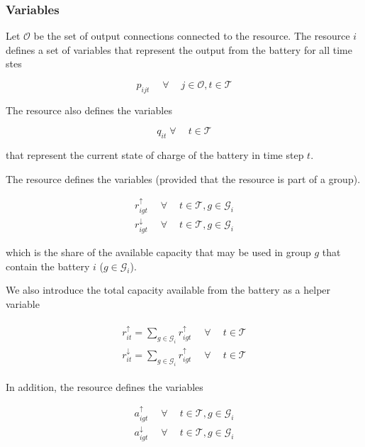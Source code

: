 \documentclass[]{report}
\newcommand{\groups}{\mathcal{G}}
\newcommand{\timesteps}{\mathcal{T}}
\newcommand{\outputs}{\mathcal{O}}
\newcommand{\soc}{q}
\let\oldforall\forall
\renewcommand{\forall}{\; \oldforall \: }
\begin{document}
\subsubsection*{Variables}
Let $\outputs$ be the set of output connections connected to the resource. The resource $i$ defines a set of variables that represent the output from the battery for all time stes

\begin{equation}
    p_{ijt} \quad \forall \quad j \in \outputs, t \in \timesteps
\end{equation}

The resource also defines the variables 

\begin{equation}
    \soc_{it} \forall \quad t \in \timesteps
\end{equation}

that represent the current state of charge of the battery in time step $t$.

The resource defines the variables (provided that the resource is part of a group).

\begin{align}
    r^{\uparrow}_{igt} \quad \forall \quad t \in \timesteps , g \in \groups_i \\
    r^{\downarrow}_{igt} \quad \forall \quad t \in \timesteps , g \in \groups_i
\end{align}

which is the share of the available capacity that may be used in group $g$ that contain the battery $i$ ($g \in \groups_i$).

We also introduce the total capacity available from the battery as a helper variable

\begin{align}
\begin{split}    
    \label{eq:simplebattery:total_r}
    r^{\uparrow}_{it} = \sum_{g \in \groups_i} r^{\uparrow}_{igt} \quad \forall \quad t \in \timesteps \\
    r^{\downarrow}_{it} = \sum_{g \in \groups_i} r^{\uparrow}_{igt} \quad \forall \quad t \in \timesteps
\end{split}
\end{align}

In addition, the resource defines the variables

\begin{align}
    a^{\uparrow}_{igt} \quad \forall \quad t \in \timesteps, g \in \groups_i \\
    a^{\downarrow}_{igt} \quad \forall \quad t \in \timesteps, g \in \groups_i
\end{align}
\end{document}
